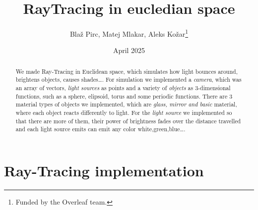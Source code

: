 \documentclass[12pt]{report}
\title{RayTracing in eucledian space}
\author{Blaž Pirc, Matej Mlakar, Aleks Kožar\thanks{Funded by the Overleaf team.}}
\date{April 2025}
\begin{document}
\maketitle

\tableofcontents

\renewcommand{\abstractname}{Introduction}
\begin{abstract}
    We made Ray-Tracing in Euclidean space, which simulates how light bounces around, brightens objects, causes shades\dots .
    For simulation we implemented a \emph{camera}, which was an array of vectors, \emph{light sources} as points and a variety of \emph{objects} as 3-dimensional functions, such as a sphere, elipsoid, torus and some periodic functions.
    There are 3 material types of objects we implemented, which are \emph{glass, mirror and basic} material, where each object reacts differently to light.
    For the \emph{light source} we implemented so that there are more of them, their power of brightness fades over the distance travelled and each light source emits can emit any color white,green,blue\dots.
\end{abstract}
\chapter{Ray-Tracing implementation}
\end{document}
